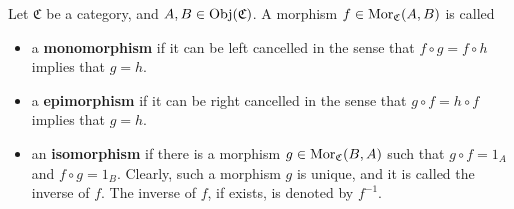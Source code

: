 \vskip 0.5cm
\begin{definition}
\mbox{}
\vskip 0.15cm
\noindent
Let $\mathfrak{C}$ be a category, and $A, B \in \textnormal{Obj}(\mathfrak{C})$.
A morphism $f \in \textnormal{Mor}_{\mathfrak{C}}(A,B)$ is called
\begin{itemize}
\item
	a \textbf{monomorphism} if it can be {\color{red}left} cancelled in the sense that
	$f \circ g = f \circ h$  implies that $g = h$.
\item
	a \textbf{epimorphism} if it can be {\color{red}right} cancelled in the sense that
	$g \circ f = h \circ f$  implies that $g = h$.
\item
	an \textbf{isomorphism} if there is a morphism $g \in \textnormal{Mor}_{\mathfrak{C}}(B,A)$
	such that $g \circ f = 1_{A}$ and $f \circ g = 1_{B}$.
	Clearly, such a morphism $g$ is unique, and it is called the inverse of $f$.
	The inverse of $f$, if exists, is denoted by $f^{-1}$.
\end{itemize}
\end{definition}


